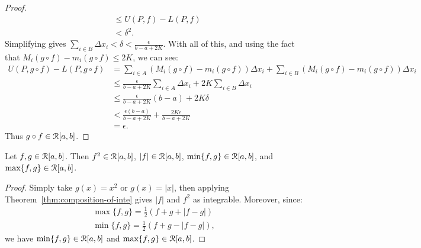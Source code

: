 \documentclass[10pt,twoside,openany]{memoir}
\begin{document}
\begin{proof}
\begin{equation*}
\begin{split}
                    & \leq U(P,f) - L(P,f) \\
                    & < \delta^2.
                \end{split}
                \end{equation*}
            Simplifying gives $\sum_{i \in B}\Delta x_i < \delta < \frac{\epsilon}{b-a + 2K}$. With all of this, and using the fact that $M_{i}(g \circ f) - m_i(g \circ f) \leq 2K$, we can see:
                \begin{equation*}
                \begin{split}
                    U(P,g\circ f) - L(P, g \circ f)
                    & = \sum_{i \in A}(M_i(g \circ f) - m_i(g \circ f))\Delta x_i + \sum_{i \in B}(M_i(g \circ f) - m_i(g \circ f))\Delta x_i\\
                    & \leq \frac{\epsilon}{b-a + 2K}\sum_{i \in A}\Delta x_i + 2K \sum_{i \in B}\Delta x_i \\
                    & \leq \frac{\epsilon}{b-a + 2K} (b-a) + 2K \delta \\
                    & < \frac{\epsilon ( b-a)}{b-a + 2K} + \frac{2K \epsilon}{b-a + 2K} \\
                    & = \epsilon.
                \end{split}
                \end{equation*}
            Thus $g \circ f \in \mathcal{R}[a,b]$.
        \end{proof}

    \begin{corollary}\label{cor:comp-props}
        Let $f,g \in \mathcal{R}[a,b]$. Then $f^2\in \mathcal{R}[a,b]$, $|f| \in \mathcal{R}[a,b]$, $\min\{f,g\} \in \mathcal{R}[a,b]$, and $\max\{f,g\} \in \mathcal{R}[a,b]$.
    \end{corollary}
        \begin{proof}
            Simply take $g(x) = x^2$ or $g(x) = |x|$, then applying Theorem~\ref{thm:composition-of-inte} gives $|f|$ and $f^2$ as integrable. Moreover, since:
                \begin{equation*}
                \begin{split}
                    \max\{f,g\} = \frac{1}{2}(f+g+|f-g|) \\
                    \min\{f,g\} = \frac{1}{2}(f+g - |f-g|),
                \end{split}
                \end{equation*}
            we have $\min\{f,g\} \in \mathcal{R}[a,b]$ and $\max\{f,g\} \in \mathcal{R}[a,b]$.
        \end{proof}
\end{document}

